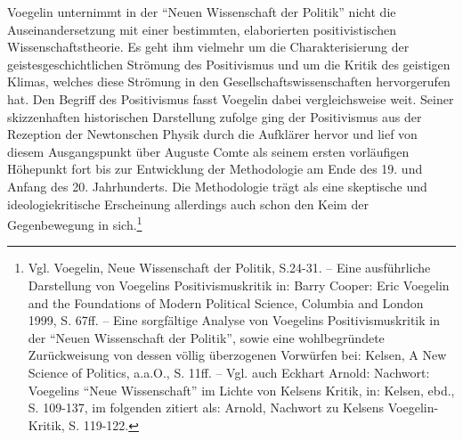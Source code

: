Voegelin unternimmt in der "`Neuen Wissenschaft der Politik"' nicht die
Auseinandersetzung mit einer bestimmten, elaborierten positivistischen
Wissenschaftstheorie. Es geht ihm vielmehr um die Charakterisierung der
geistesgeschichtlichen Strömung des Positivismus und um die Kritik des
geistigen Klimas, welches diese Strömung in den Gesellschaftswissenschaften
hervorgerufen hat. Den Begriff des Positivismus fasst Voegelin dabei
vergleichsweise weit. Seiner skizzenhaften historischen Darstellung zufolge
ging der Positivismus aus der Rezeption der Newtonschen Physik durch die
Aufklärer hervor und lief von diesem Ausgangspunkt über Auguste Comte als
seinem ersten vorläufigen Höhepunkt fort bis zur Entwicklung der Methodologie
am Ende des 19. und Anfang des 20. Jahrhunderts. Die Methodologie trägt als
eine skeptische und ideologiekritische Erscheinung allerdings auch schon den
Keim der Gegenbewegung in sich.\footnote{Vgl. Voegelin, Neue Wissenschaft der
  Politik, S.24-31. -- Eine ausführliche Darstellung von Voegelins
  Positivismuskritik in: Barry Cooper: Eric Voegelin and the Foundations of
  Modern Political Science, Columbia and London 1999, S. 67ff. -- Eine
  sorgfältige Analyse von Voegelins Positivismuskritik in der "`Neuen
  Wissenschaft der Politik"', sowie eine wohlbegründete Zurückweisung von
  dessen völlig überzogenen Vorwürfen bei: Kelsen, A New Science of Politics,
  a.a.O., S. 11ff. -- Vgl. auch Eckhart Arnold: Nachwort: Voegelins "`Neue
  Wissenschaft"' im Lichte von Kelsens Kritik, in: Kelsen, ebd., S. 109-137,
  im folgenden zitiert als: Arnold, Nachwort zu Kelsens Voegelin-Kritik, S.
  119-122.}
  
